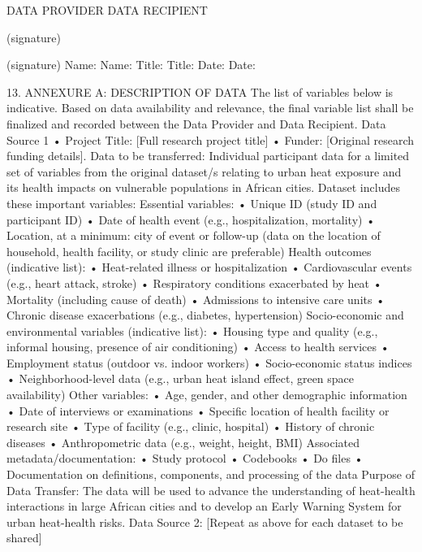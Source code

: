 \documentclass[12pt,letterpaper]{article}
\begin{document}
DATA PROVIDER	DATA RECIPIENT

(signature)	 

(signature) Name:	Name: Title:	Title: Date:	Date:

13.	ANNEXURE A: DESCRIPTION OF DATA The list of variables below is indicative. Based on data availability and relevance, the final variable list shall be finalized and recorded between the Data Provider and Data Recipient. Data Source 1 •	Project Title: [Full research project title] •	Funder: [Original research funding details]. Data to be transferred: Individual participant data for a limited set of variables from the original dataset/s relating to urban heat exposure and its health impacts on vulnerable populations in African cities. Dataset includes these important variables: Essential variables: •	Unique ID (study ID and participant ID) •	Date of health event (e.g., hospitalization, mortality) •	Location, at a minimum: city of event or follow-up (data on the location of household, health facility, or study clinic are preferable) Health outcomes (indicative list): •	Heat-related illness or hospitalization •	Cardiovascular events (e.g., heart attack, stroke) •	Respiratory conditions exacerbated by heat •	Mortality (including cause of death) •	Admissions to intensive care units •	Chronic disease exacerbations (e.g., diabetes, hypertension) Socio-economic and environmental variables (indicative list): •	Housing type and quality (e.g., informal housing, presence of air conditioning) •	Access to health services •	Employment status (outdoor vs. indoor workers) •	Socio-economic status indices •	Neighborhood-level data (e.g., urban heat island effect, green space availability) Other variables: •	Age, gender, and other demographic information •	Date of interviews or examinations •	Specific location of health facility or research site •	Type of facility (e.g., clinic, hospital) •	History of chronic diseases •	Anthropometric data (e.g., weight, height, BMI) Associated metadata/documentation: •	Study protocol •	Codebooks •	Do files •	Documentation on definitions, components, and processing of the data Purpose of Data Transfer: The data will be used to advance the understanding of heat-health interactions in large African cities and to develop an Early Warning System for urban heat-health risks. Data Source 2: [Repeat as above for each dataset to be shared]
\end{document}
